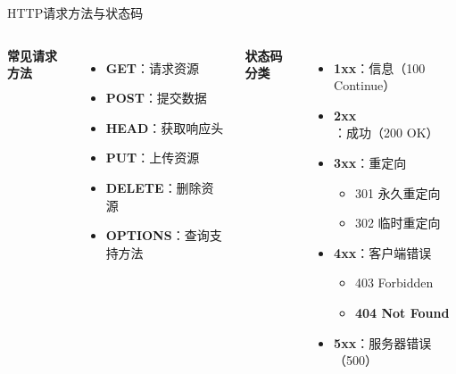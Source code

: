 \documentclass[10pt, aspectratio=169]{beamer}
\begin{document}
\begin{frame}{HTTP请求方法与状态码}
    \begin{columns}[t]
        \textbf{常见请求方法}
        \begin{itemize}
            \item \textbf{GET}：请求资源
            \item \textbf{POST}：提交数据
            \item \textbf{HEAD}：获取响应头
            \item \textbf{PUT}：上传资源
            \item \textbf{DELETE}：删除资源
            \item \textbf{OPTIONS}：查询支持方法
        \end{itemize}
        \textbf{状态码分类}
        \begin{itemize}
            \item \textbf{1xx}：信息（100 Continue）
            \item \textbf{2xx}：成功（200 OK）
            \item \textbf{3xx}：重定向
            \begin{itemize}
                \item 301 永久重定向
                \item 302 临时重定向
            \end{itemize}
            \item \textbf{4xx}：客户端错误
            \begin{itemize}
                \item 403 Forbidden
                \item \textbf{404 Not Found}
            \end{itemize}
            \item \textbf{5xx}：服务器错误（500）
        \end{itemize}
    \end{columns}
\end{frame}
\end{document}
